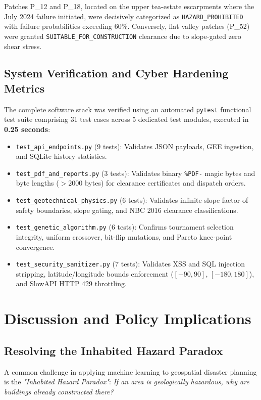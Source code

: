 \documentclass[conference]{IEEEtran}
\begin{document}
Patches P\_12 and P\_18, located on the upper tea-estate escarpments where the July 2024 failure initiated, were decisively categorized as \texttt{HAZARD\_PROHIBITED} with failure probabilities exceeding 60\%. Conversely, flat valley patches (P\_52) were granted \texttt{SUITABLE\_FOR\_CONSTRUCTION} clearance due to slope-gated zero shear stress.

\subsection{System Verification and Cyber Hardening Metrics}
The complete software stack was verified using an automated \texttt{pytest} functional test suite comprising 31 test cases across 5 dedicated test modules, executed in \textbf{0.25 seconds}:
\begin{itemize}
    \item \texttt{test\_api\_endpoints.py} (9 tests): Validates JSON payloads, GEE ingestion, and SQLite history statistics.
    \item \texttt{test\_pdf\_and\_reports.py} (3 tests): Validates binary \texttt{\%PDF-} magic bytes and byte lengths ($>2000$ bytes) for clearance certificates and dispatch orders.
    \item \texttt{test\_geotechnical\_physics.py} (6 tests): Validates infinite-slope factor-of-safety boundaries, slope gating, and NBC 2016 clearance classifications.
    \item \texttt{test\_genetic\_algorithm.py} (6 tests): Confirms tournament selection integrity, uniform crossover, bit-flip mutations, and Pareto knee-point convergence.
    \item \texttt{test\_security\_sanitizer.py} (7 tests): Validates XSS and SQL injection stripping, latitude/longitude bounds enforcement ($[-90, 90]$, $[-180, 180]$), and SlowAPI HTTP 429 throttling.
\end{itemize}

\section{Discussion and Policy Implications}

\subsection{Resolving the Inhabited Hazard Paradox}
A common challenge in applying machine learning to geospatial disaster planning is the \textit{"Inhabited Hazard Paradox"}: \textit{If an area is geologically hazardous, why are buildings already constructed there?}
\end{document}
